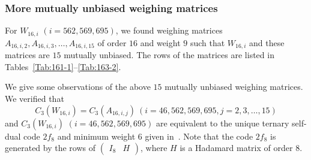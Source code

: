 \documentclass[12pt]{article}
\theoremstyle{remark}
\begin{document}
\subsubsection{More mutually unbiased  weighing matrices}
 
For $W_{16,i}$ $(i=562,569,695)$, we found weighing matrices 
$A_{16,i,2},A_{16,i,3},\ldots, A_{16,i,15}$
of order $16$ and weight $9$ 
such that $W_{16,i}$ and these matrices are $15$ mutually unbiased.
The rows of the matrices are listed in 
Tables~\ref{Tab:161-1}--\ref{Tab:163-2}.

We give some observations of the above $15$ mutually unbiased weighing matrices.
We verified that
\[
C_3(W_{16,i})=
C_3(A_{16,i,j})
\ (i=46,562,569,695, j=2,3,\ldots,15)
\]
and $C_3(W_{16,i})$ $(i=46,562,569,695)$ are  equivalent to the unique ternary self-dual code $2f_8$
and minimum weight $6$ given in~\cite[Section~VI]{CPS}.
Note that the code $2f_8$ is generated by the rows of 
$
\left(
\begin{array}{cc}
I_8 & H
\end{array}
\right)
$,
where $H$ is a Hadamard matrix of order $8$.
\end{document}
